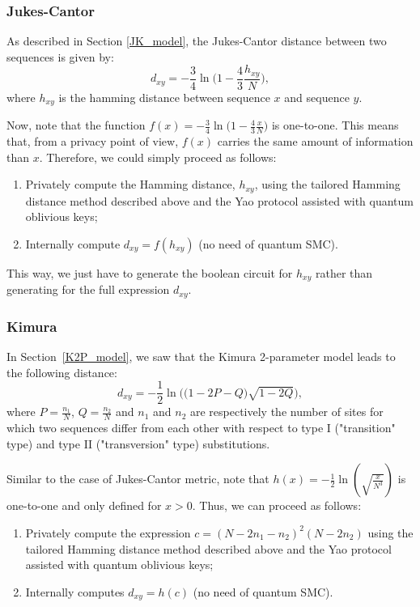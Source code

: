 \subsubsection{Jukes-Cantor} 
As described in Section \ref{JK_model}, the Jukes-Cantor distance between two sequences is given by:
$$d_{xy} = -\frac{3}{4} \ln \Big(1- \frac{4}{3}\frac{h_{xy}}{N}\Big),$$
where $h_{xy}$ is the hamming distance between sequence $x$ and sequence $y$.

Now, note that the function $f(x) = -\frac{3}{4} \ln \Big(1- \frac{4}{3}\frac{x}{N}\Big)$ is one-to-one. This means that, from a privacy point of view, $f(x)$ carries the same amount of information than $x$. Therefore, we could simply proceed as follows:

\begin{enumerate}
    \item Privately compute the Hamming distance, $h_{xy}$, using the tailored Hamming distance method described above and the Yao protocol assisted with quantum oblivious keys;
    \item Internally compute $d_{xy} = f(h_{xy})$ (no need of quantum SMC).
\end{enumerate}

This way, we just have to generate the boolean circuit for $h_{xy}$ rather than generating for the full expression $d_{xy}$.


\subsubsection{Kimura}
In Section~\ref{K2P_model}, we saw that the Kimura 2-parameter model leads to the following distance:
$$d_{xy} = -\frac{1}{2}\ln\bigg( \big(1-2P-Q\big) \sqrt{1-2Q} \bigg),$$
where $P=\frac{n_1}{N}$, $Q=\frac{n_2}{N}$ and $n_1$ and $n_2$ are respectively the number of sites for which two sequences differ from each other with respect to type I ("transition" type) and type II ("transversion" type) substitutions.

Similar to the case of Jukes-Cantor metric, note that $h(x) = -\frac{1}{2}\ln(\sqrt{\frac{x}{N^3}})$ is one-to-one and only defined for $x>0$. Thus, we can proceed as follows:

\begin{enumerate}
    \item Privately compute the expression $c = (N-2n_1-n_2)^2(N-2n_2)$ using the tailored Hamming distance method described above and the Yao protocol assisted with quantum oblivious keys;
    
    \item Internally computes $d_{xy} = h(c)$ (no need of quantum SMC).
\end{enumerate}

